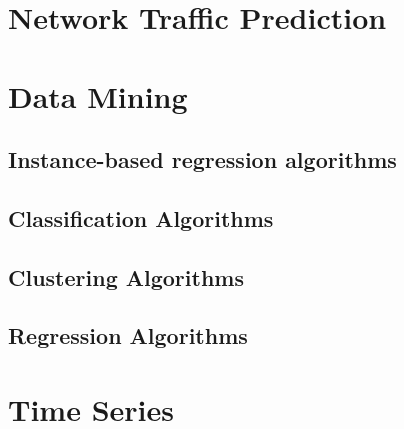 \section{Network Traffic Prediction}\label{sec:network}

\section{Data Mining}\label{sec:datamining}

\subsection{Instance-based regression algorithms}\label{sec:instance}

\subsection{Classification Algorithms}\label{sec:classification}

\subsection{Clustering Algorithms}\label{sec:clust}

\subsection{Regression Algorithms}\label{sec:regr}

\section{Time Series}\label{sec:timeseries}
